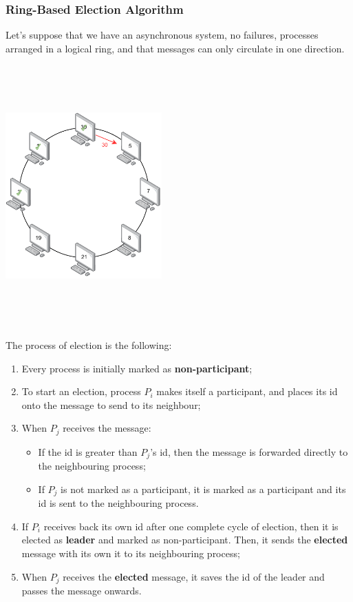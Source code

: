 \documentclass{article}
\begin{document}
\subsubsection{Ring-Based Election Algorithm}
Let's suppose that we have an asynchronous system, no failures, processes arranged in a logical ring, and that messages can only circulate in one direction.
\begin{center}
	\includegraphics[width=6cm, height=10cm, keepaspectratio]{assets/ring-election.pdf}
\end{center}
The process of election is the following:
\begin{enumerate}
	\item Every process is initially marked as \textbf{non-participant};
	\item To start an election, process $P_i$ makes itself a participant, and places its id onto the message to send to its neighbour;
	\item When $P_j$ receives the message:
	\begin{itemize}
		\item If the id is greater than $P_j$'s id, then the message is forwarded directly to the neighbouring process;
		\item If $P_j$ is not marked as a participant, it is marked as a participant and its id is sent to the neighbouring process.
	\end{itemize}
	\item If $P_i$ receives back its own id after one complete cycle of election, then it is elected as \textbf{leader} and marked as non-participant. Then, it sends  the \textbf{elected} message with its own it to its neighbouring process;
	\item When $P_j$ receives the \textbf{elected} message, it saves the id of the leader and passes the message onwards.
\end{enumerate}
\end{document}
